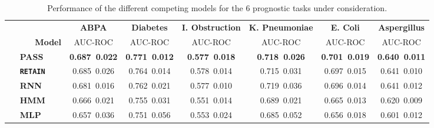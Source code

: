 \documentclass[twoside,11pt]{article}
\begin{document}
\begin{table*}[t]
\centering
\begin{tabular}{l||cccccc}           
 & {\tiny \bf ABPA} & {\tiny \bf Diabetes} & {\tiny {\bf I. Obstruction}} & {\tiny \bf K. Pneumoniae} & {\tiny \bf E. Coli} & {\tiny {\bf Aspergillus}}  \\
{\tiny \,\,\,\,\,\,\,\,\,\,\,\,\,\,\,\,\,\,\,\textbf{Model}} & {\tiny AUC-ROC} & {\tiny AUC-ROC} & {\tiny AUC-ROC} & {\tiny AUC-ROC} & {\tiny AUC-ROC} & {\tiny AUC-ROC}\\
\hline \hline
{\tiny \,\,\,\,\,\,\,\,\textbf{PASS}} & {\bf \mbox{\tiny 0.687  0.022}} & {\bf \mbox{\tiny 0.771  0.012}} & {\bf \mbox{\tiny 0.577  0.018}} & {\bf \mbox{\tiny 0.718  0.026}} & {\bf \mbox{\tiny 0.701  0.019}} & {\bf \mbox{\tiny 0.640  0.011}} \\ 
{\tiny \,\,\,\,\,\,\,\,\textbf{\texttt{RETAIN}}} & \mbox{\tiny 0.685  0.026} & \mbox{\tiny 0.764  0.014} & \mbox{\tiny 0.578  0.014} & \mbox{\tiny 0.715  0.031} & \mbox{\tiny 0.697  0.015} & \mbox{\tiny 0.641  0.010} \\ 
{\tiny \,\,\,\,\,\,\,\,\textbf{RNN}} & \mbox{\tiny 0.681  0.016} & \mbox{\tiny 0.762  0.021} & \mbox{\tiny 0.577  0.010}  & \mbox{\tiny 0.719  0.036} & \mbox{\tiny 0.696  0.014} & \mbox{\tiny 0.641  0.012}   \\  
{\tiny \,\,\,\,\,\,\,\,\textbf{HMM}} & \mbox{\tiny 0.666  0.021} & \mbox{\tiny 0.755  0.031} & \mbox{\tiny 0.551  0.014} & \mbox{\tiny 0.689  0.021} & \mbox{\tiny 0.665  0.013} & \mbox{\tiny 0.620  0.009}   \\   
{\tiny \,\,\,\,\,\,\,\,\textbf{MLP}} & \mbox{\tiny 0.657  0.036} & \mbox{\tiny 0.751  0.056} & \mbox{\tiny 0.553  0.024} & \mbox{\tiny 0.685  0.052} & \mbox{\tiny 0.656  0.018} & \mbox{\tiny 0.601  0.012} \\   
\end{tabular}
\caption{\footnotesize Performance of the different competing models for the 6 prognostic tasks under consideration.}
\label{Table2}
\end{table*}
\end{document}
